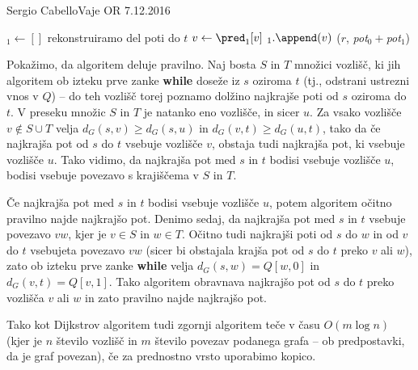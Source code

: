 \begin{naloga}{Sergio Cabello}{Vaje OR 7.12.2016}
\begin{odgovor}
\begin{small}
\begin{algorithmic}
    $_1 \gets []$
    \While{$\pred_1[v] \ne \Null$} \hfill rekonstruiramo del poti do $t$
        \State $v \gets \pred_1[v]$
        $_1.\append(v)$
    \EndWhile
    \State \Return ($r$, {\sl pot}$_0 +${\sl pot}$_1$)
\EndFunction
\end{algorithmic}
\end{small}
Pokažimo, da algoritem deluje pravilno.
Naj bosta $S$ in $T$ množici vozlišč,
ki jih algoritem ob izteku prve zanke {\bf while} doseže iz $s$ oziroma $t$
(tj., odstrani ustrezni vnos v $Q$)
-- do teh vozlišč torej poznamo dolžino najkrajše poti od $s$ oziroma do $t$.
V preseku množic $S$ in $T$ je natanko eno vozlišče, in sicer $u$.
Za vsako vozlišče $v \not\in S \cup T$
velja $d_G(s, v) \ge d_G(s, u)$ in $d_G(v, t) \ge d_G(u, t)$,
tako da če najkrajša pot od $s$ do $t$ vsebuje vozlišče $v$,
obstaja tudi najkrajša pot, ki vsebuje vozlišče $u$.
Tako vidimo, da najkrajša pot med $s$ in $t$ bodisi vsebuje vozlišče $u$,
bodisi vsebuje povezavo s krajiščema v $S$ in $T$.

Če najkrajša pot med $s$ in $t$ bodisi vsebuje vozlišče $u$,
potem algoritem očitno pravilno najde najkrajšo pot.
Denimo sedaj, da najkrajša pot med $s$ in $t$ vsebuje povezavo $vw$,
kjer je $v \in S$ in $w \in T$.
Očitno tudi najkrajši poti od $s$ do $w$ in od $v$ do $t$
vsebujeta povezavo $vw$
(sicer bi obstajala krajša pot od $s$ do $t$ preko $v$ ali $w$),
zato ob izteku prve zanke {\bf while}
velja $d_G(s, w) = Q[w, 0]$ in $d_G(v, t) = Q[v, 1]$.
Tako algoritem obravnava najkrajšo pot
od $s$ do $t$ preko vozlišča $v$ ali $w$
in zato pravilno najde najkrajšo pot.

Tako kot Dijkstrov algoritem
tudi zgornji algoritem teče v času $O(m \log n)$
(kjer je $n$ število vozlišč in $m$ število povezav podanega grafa
-- ob predpostavki, da je graf povezan),
če za prednostno vrsto uporabimo kopico.
\end{odgovor}
\end{naloga}
